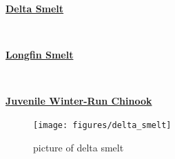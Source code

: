 \documentclass[
]{book}
\begin{document}
\begin{panel-grid}

\begin{columns-nocenter}

\begin{column800}

\textbf{\href{http://calfish.ucdavis.edu/species/?uid=47\&ds=698}{Delta Smelt}}

\end{column800}

\begin{column40}

~

\end{column40}

\begin{column800}

\textbf{\href{http://calfish.ucdavis.edu/species/?uid=87\&ds=698}{Longfin Smelt}}

\end{column800}

\begin{column40}

~

\end{column40}

\begin{column800}

\textbf{\href{http://calfish.ucdavis.edu/species/?uid=30\&ds=698}{Juvenile Winter-Run Chinook}}

\end{column800}

\end{columns-nocenter}

\begin{columns-nocenter}

\begin{column800}

\begin{figure}

{\centering \texttt{[image: figures/delta\_smelt]} 

}

\caption{picture of delta smelt}\label{fig:unnamed-chunk-40}
\end{figure}

\end{column800}

\begin{column40}

~

\end{column40}


\end{columns-nocenter}
\end{panel-grid}
\end{document}
